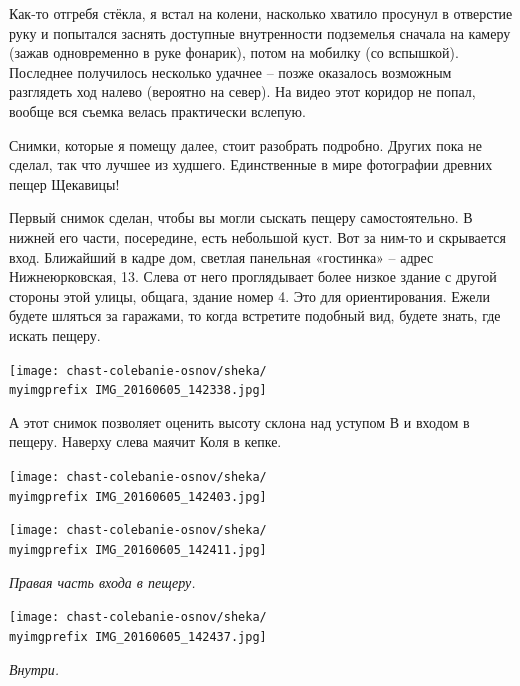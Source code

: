 Как-то отгребя стёкла, я встал на колени, насколько хватило просунул в отверстие руку и попытался заснять доступные внутренности подземелья сначала на камеру (зажав одновременно в руке фонарик), потом на мобилку (со вспышкой). Последнее получилось несколько удачнее – позже оказалось возможным разглядеть ход налево (вероятно на север). На видео этот коридор не попал, вообще вся съемка велась практически вслепую.

Снимки, которые я помещу далее, стоит разобрать подробно. Других пока не сделал, так что лучшее из худшего. Единственные в мире фотографии древних пещер Щекавицы!

Первый снимок сделан, чтобы вы могли сыскать пещеру самостоятельно. В нижней его части, посередине, есть небольшой куст. Вот за ним-то и скрывается вход. Ближайший в кадре дом, светлая панельная «гостинка» – адрес Нижнеюрковская, 13. Слева от него проглядывает более низкое здание с другой стороны этой улицы, общага, здание номер 4. Это для ориентирования. Ежели будете шляться за гаражами, то когда встретите подобный вид, будете знать, где искать пещеру.

\begin{center}
\texttt{[image: chast-colebanie-osnov/sheka/\\myimgprefix IMG\_20160605\_142338.jpg]}
\end{center}

\newpage

А этот снимок позволяет оценить высоту склона над уступом В и входом в пещеру. Наверху слева маячит Коля в кепке.
\vspace*{\fill}
\begin{center}
\texttt{[image: chast-colebanie-osnov/sheka/\\myimgprefix IMG\_20160605\_142403.jpg]}
\end{center}
\vspace*{\fill}
\newpage

\begin{center}
\texttt{[image: chast-colebanie-osnov/sheka/\\myimgprefix IMG\_20160605\_142411.jpg]}

\textit{Правая часть входа в пещеру.}
\end{center}

   
\begin{center}
\texttt{[image: chast-colebanie-osnov/sheka/\\myimgprefix IMG\_20160605\_142437.jpg]}

\textit{Внутри.}
\end{center}

